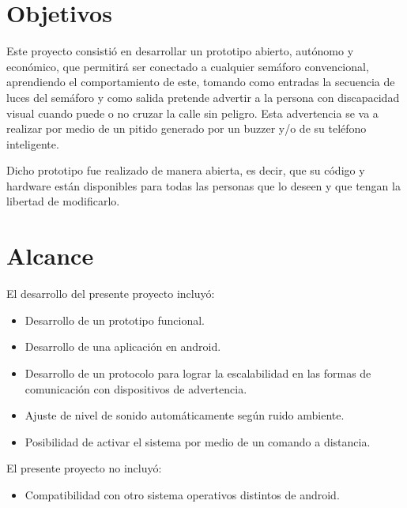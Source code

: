 \section{Objetivos}

Este proyecto consistió en desarrollar un prototipo abierto, autónomo y económico, que permitirá ser conectado a cualquier semáforo convencional, aprendiendo el comportamiento de este, tomando como entradas la secuencia de luces del semáforo y como salida pretende advertir a la persona con discapacidad visual cuando puede o no cruzar la calle sin peligro. Esta advertencia se va a realizar por medio de un pitido generado por un buzzer y/o de su teléfono inteligente.

Dicho prototipo fue realizado de manera abierta, es decir, que su código y hardware están disponibles para todas las personas que lo  deseen y que tengan la libertad de modificarlo.


\section{Alcance}

El desarrollo del presente proyecto incluyó:
\begin{itemize}
\item Desarrollo de un prototipo funcional.
\item Desarrollo de una aplicación en android.
\item Desarrollo de un protocolo para lograr la escalabilidad en las formas de comunicación con dispositivos de advertencia.
\item Ajuste de nivel de sonido automáticamente según ruido ambiente.
\item Posibilidad de activar el sistema por medio de un comando a distancia.
\end{itemize}

El presente proyecto no incluyó:
\begin{itemize}
\item Compatibilidad con otro sistema operativos distintos de android.
\end{itemize}







